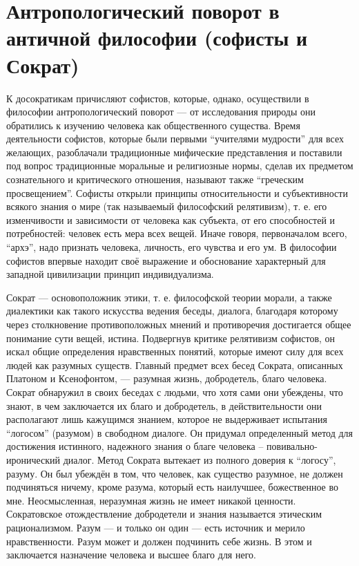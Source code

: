 \documentclass[12pt]{article}
\begin{document}
\newpage
\section{Антропологический поворот в античной философии (софисты и Сократ)}
К досократикам причисляют софистов, которые, однако, осуществили в философии антропологический поворот
---  от  исследования  природы  они  обратились  к  изучению  человека  как  общественного  существа.
Время
деятельности  софистов,  которые  были  первыми  “учителями  мудрости”  для  всех  желающих,  разоблачали
традиционные мифические представления и поставили под вопрос традиционные моральные и религиозные
нормы,  сделав  их  предметом  сознательного  и  критического  отношения,  называют  также  “греческим
просвещением”. Софисты открыли принципы относительности и субъективности всякого знания о мире (так
называемый философский релятивизм), т. е. его изменчивости и зависимости от человека как субъекта, от его
способностей и потребностей: человек есть мера всех вещей. Иначе говоря, первоначалом всего, “архэ”, надо
признать человека, личность, его чувства и его ум. В философии софистов впервые находит своё выражение и
обоснование характерный для западной цивилизации принцип индивидуализма. 

Сократ --- основоположник этики, т. е. философской теории морали, а также диалектики как такого искусства
ведения беседы, диалога, благодаря которому через столкновение противоположных мнений и противоречия
достигается общее понимание сути вещей, истина. Подвергнув критике релятивизм софистов, он искал общие
определения нравственных понятий, которые имеют силу для всех людей как разумных существ. Главный
предмет  всех  бесед  Сократа,  описанных  Платоном  и  Ксенофонтом, --- разумная  жизнь,  добродетель,
благо человека. 
Сократ обнаружил в своих беседах с людьми, что хотя сами они убеждены, что знают, в чем заключается их
благо и добродетель, в действительности они располагают лишь кажущимся знанием, которое не выдерживает
испытания “логосом” (разумом)  в  свободном  диалоге.  Он  придумал  определенный  метод  для  достижения
истинного, надежного знания о благе человека – повивально-иронический диалог. Метод Сократа вытекает из
полного доверия к “логосу”, разуму. Он был убеждён в том, что человек, как существо разумное, не должен
подчиняться ничему, кроме разума, который есть наилучшее, божественное во мне. Неосмысленная, неразумная
жизнь не имеет никакой ценности. Сократовское отождествление добродетели и знания называется этическим
рационализмом. Разум --- и только он один --- есть источник и мерило нравственности. Разум может и должен
подчинить себе жизнь. В этом и заключается назначение человека и высшее благо для него. 
\end{document}
